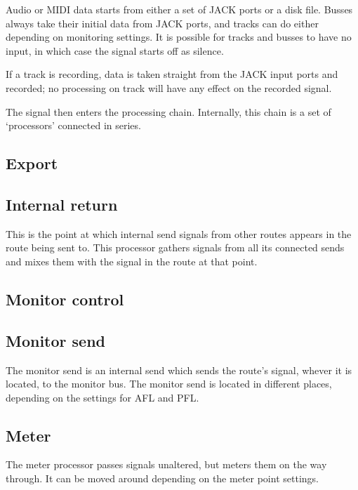 \documentclass[10pt,a4paper]{book}
\begin{document}
Audio or MIDI data starts from either a set of JACK ports or a disk
file.  Busses always take their initial data from JACK ports, and
tracks can do either depending on monitoring settings.  It is possible
for tracks and busses to have no input, in which case the signal
starts off as silence.

If a track is recording, data is taken straight from the JACK input
ports and recorded; no processing on track will have any effect on the
recorded signal.

The signal then enters the processing chain.  Internally, this chain
is a set of `processors' connected in series.  

\subsection{Export}


\subsection{Internal return}

This is the point at which internal send signals from other routes
appears in the route being sent to.  This processor gathers signals
from all its connected sends and mixes them with the signal in the
route at that point.

\subsection{Monitor control}


\subsection{Monitor send}

The monitor send is an internal send which sends the route's signal,
whever it is located, to the monitor bus.  The monitor send is located
in different places, depending on the settings for AFL and PFL\@.

\subsection{Meter}

The meter processor passes signals unaltered, but meters them on the
way through.  It can be moved around depending on the meter point settings.
\end{document}
